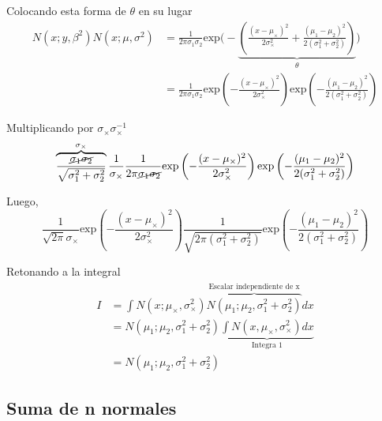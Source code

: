 \documentclass[article]{jss}
\begin{document}
\begin{appendix}
Colocando esta forma de $\theta$ en su lugar
\begin{equation}
\begin{split}
 N(x;y,\beta^2)N(x;\mu,\sigma^2) & = \frac{1}{2\pi\sigma_1\sigma_2}\text{exp}\Bigg(-\underbrace{\left( \frac{(x-\mu_{\times})^2}{2\sigma_{\times}^2} + \frac{(\mu_1 - \mu_2)^2}{2(\sigma_1^2 + \sigma_2^2)} \right)}_{\theta} \Bigg) \\
 & = \frac{1}{2\pi\sigma_1\sigma_2}\text{exp}\left(  - \frac{(x-\mu_{\times})^2}{2\sigma_{\times}^2} \right) \text{exp} \left( - \frac{(\mu_1 - \mu_2)^2}{2(\sigma_1^2 + \sigma_2^2)} \right)
\end{split}
\end{equation}

Multiplicando por $\sigma_{\times}\sigma_{\times}^{-1}$
\begin{equation}
\overbrace{\frac{\cancel{\sigma_1\sigma_2}}{\sqrt{\sigma_1^2+\sigma_2^2}}}^{\sigma_{\times}} \frac{1}{\sigma_{\times}} \frac{1}{2\pi\cancel{\sigma_1\sigma_2}}\text{exp}\left(  - \frac{(x-\mu_{\times})^2}{2\sigma_{\times}^2} \right) \text{exp} \left( - \frac{(\mu_1 - \mu_2)^2}{2(\sigma_1^2 + \sigma_2^2)} \right)
\end{equation}

Luego,
\begin{equation}
 \frac{1}{\sqrt{2\pi}\sigma_{\times}}\text{exp}\left(  - \frac{(x-\mu_{\times})^2}{2\sigma_{\times}^2} \right) \frac{1}{\sqrt{2\pi(\sigma_1^2+\sigma_2^2)}} \text{exp} \left( - \frac{(\mu_1 - \mu_2)^2}{2(\sigma_1^2 + \sigma_2^2)} \right)
\end{equation}

Retonando a la integral
\begin{equation}
\begin{split}
I & = \int N(x;\mu_{\times},\sigma_{\times}^2) \overbrace{N(\mu_1;\mu_2,\sigma_1^2 + \sigma_2^2)}^{\text{Escalar independiente de x}} dx \\[0.3cm]
& = N(\mu_1;\mu_2,\sigma_1^2 + \sigma_2^2) \underbrace{\int N(x,\mu_{\times},\sigma_{\times}^2)  dx}_{\text{Integra 1}} \\
& = N(\mu_1;\mu_2,\sigma_1^2 + \sigma_2^2)
\end{split}
\end{equation}

\subsection{Suma de n normales}\label{suma_normales_induccion}


\end{appendix}
\end{document}
